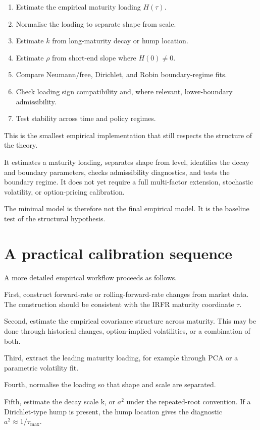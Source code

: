 \documentclass[11pt,oneside]{book}
\begin{document}
\begin{enumerate}
\item Estimate the empirical maturity loading $H(\tau)$.
\item Normalise the loading to separate shape from scale.
\item Estimate $k$ from long-maturity decay or hump location.
\item Estimate $\rho$ from short-end slope where $H(0)\neq0$.
\item Compare Neumann/free, Dirichlet, and Robin boundary-regime fits.
\item Check loading sign compatibility and, where relevant, lower-boundary admissibility.
\item Test stability across time and policy regimes.
\end{enumerate}

This is the smallest empirical implementation that still respects the
structure of the theory.

It estimates a maturity loading, separates shape from level, identifies
the decay and boundary parameters, checks admissibility diagnostics, and
tests the boundary regime. It does not yet require a full multi-factor
extension, stochastic volatility, or option-pricing calibration.

The minimal model is therefore not the final empirical model. It is the
baseline test of the structural hypothesis.

\section{A practical calibration
sequence}\label{a-practical-calibration-sequence}

A more detailed empirical workflow proceeds as follows.

First, construct forward-rate or rolling-forward-rate changes from
market data. The construction should be consistent with the IRFR
maturity coordinate $\tau$.

Second, estimate the empirical covariance structure across maturity.
This may be done through historical changes, option-implied
volatilities, or a combination of both.

Third, extract the leading maturity loading, for example through PCA or
a parametric volatility fit.

Fourth, normalise the loading so that shape and scale are separated.

Fifth, estimate the decay scale k, or $a^2$ under the repeated-root
convention. If a Dirichlet-type hump is present, the hump location gives
the diagnostic $a^2\approx1/\tau_{\max}$.
\end{document}

